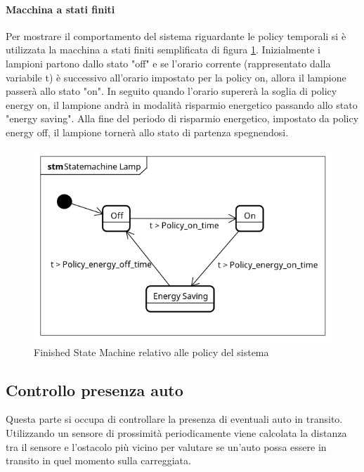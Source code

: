 \paragraph{Macchina a stati finiti}
Per mostrare il comportamento del sistema riguardante le policy temporali si è utilizzata la macchina a stati finiti semplificata di figura \ref{FSM POLICY}.
Inizialmente i lampioni partono dallo stato "off" e se l'orario corrente (rappresentato dalla variabile t) è successivo all'orario impostato per la policy on, allora il lampione passerà allo stato "on". In seguito quando l'orario supererà la soglia di policy energy on, il lampione andrà in modalità risparmio energetico passando allo stato "energy saving".
Alla fine del periodo di risparmio energetico, impostato da policy energy off, il lampione tornerà allo stato di partenza spegnendosi.
\begin{figure}[ht]
	\centering
	\includegraphics[scale=.8]{figure/Statemachine_Lamp.png}
	\caption{Finished State Machine relativo alle policy del sistema \label{FSM POLICY}}
\end{figure}

\newpage
\subsection{Controllo presenza auto}
Questa parte si occupa di controllare la presenza di eventuali auto in transito. Utilizzando un sensore di prossimità periodicamente viene calcolata la distanza tra il sensore e l'ostacolo più vicino per valutare se un'auto possa essere in transito in quel momento sulla carreggiata.
